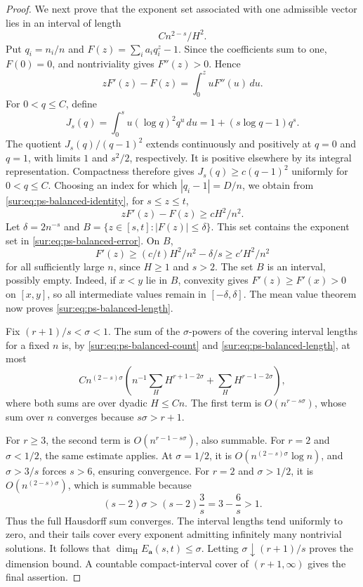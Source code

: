 \documentclass[11pt,a4paper]{article}
\theoremstyle{definition}
\theoremstyle{remark}
\numberwithin{equation}{section}
\begin{document}
\begin{proof}
We next prove that the exponent set associated with one admissible
vector lies in an interval of length
\begin{equation}\label{sur:eq:ps-balanced-length}
 C n^{2-s}/H^2.
\end{equation}
Put $q_i=n_i/n$ and $F(z)=\sum_i a_i q_i^z-1$. Since the coefficients
sum to one, $F(0)=0$, and nontriviality gives $F''(z)>0$. Hence
\begin{equation}\label{sur:eq:ps-balanced-identity}
 zF'(z)-F(z)=\int_0^z uF''(u)\,du.
\end{equation}
For $0<q\le C$, define
\[
 J_s(q)=\int_0^s u(\log q)^2q^u\,du
       =1+(s\log q-1)q^s.
\]
The quotient $J_s(q)/(q-1)^2$ extends continuously and positively at
$q=0$ and $q=1$, with limits $1$ and $s^2/2$, respectively. It is
positive elsewhere by its integral representation. Compactness
therefore gives $J_s(q)\ge c(q-1)^2$ uniformly for $0<q\le C$.
Choosing an index for which $|q_i-1|=D/n$, we obtain from
\eqref{sur:eq:ps-balanced-identity}, for $s\le z\le t$,
\[
 zF'(z)-F(z)\ge cH^2/n^2.
\]
Let $\delta=2n^{-s}$ and
$B=\{z\in[s,t]:|F(z)|\le\delta\}$. This set contains the exponent
set in \eqref{sur:eq:ps-balanced-error}. On $B$,
\[
 F'(z)\ge (c/t)H^2/n^2-\delta/s
          \ge c' H^2/n^2
\]
for all sufficiently large $n$, since $H\ge1$ and $s>2$.
The set $B$ is an interval, possibly empty. Indeed, if $x<y$ lie in
$B$, convexity gives $F'(z)\ge F'(x)>0$ on $[x,y]$, so all
intermediate values remain in $[-\delta,\delta]$. The mean value
theorem now proves \eqref{sur:eq:ps-balanced-length}.

Fix $(r+1)/s<\sigma<1$. The sum of the $\sigma$-powers of the covering
interval lengths for a fixed $n$ is, by
\eqref{sur:eq:ps-balanced-count} and \eqref{sur:eq:ps-balanced-length}, at most
\begin{equation}\label{sur:eq:ps-balanced-sum}
 Cn^{(2-s)\sigma}
 \left(n^{-1}\sum_H H^{r+1-2\sigma}
                   +\sum_H H^{r-1-2\sigma}\right),
\end{equation}
where both sums are over dyadic $H\le Cn$. The first term is
$O(n^{r-s\sigma})$, whose sum over $n$ converges because
$s\sigma>r+1$.

For $r\ge3$, the second term is $O(n^{r-1-s\sigma})$, also summable.
For $r=2$ and $\sigma<1/2$, the same estimate applies. At
$\sigma=1/2$, it is $O(n^{(2-s)\sigma}\log n)$, and
$\sigma>3/s$ forces $s>6$, ensuring convergence. For $r=2$ and
$\sigma>1/2$, it is $O(n^{(2-s)\sigma})$, which is summable because
\[
 (s-2)\sigma>(s-2)\frac3s=3-\frac6s>1.
\]
Thus the full Hausdorff sum converges. The interval lengths tend
uniformly to zero, and their tails cover every exponent admitting
infinitely many nontrivial solutions. It follows that
$\dim_{\mathrm H}E_{\boldsymbol a}(s,t)\le\sigma$. Letting
$\sigma\downarrow(r+1)/s$ proves the dimension bound. A countable
compact-interval cover of $(r+1,\infty)$ gives the final assertion.
\end{proof}
\end{document}
